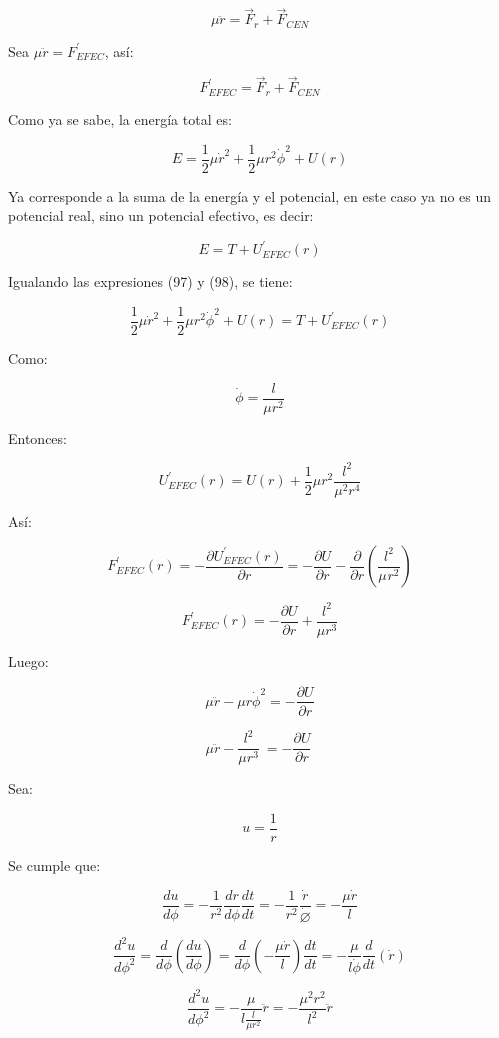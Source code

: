 \documentclass[]{article}
\begin{document}
\[\mu\ddot{r} = {\overrightarrow{F}}_{r} + {\overrightarrow{F}}_{CEN}\]

Sea \(\mu\ddot{r} = F_{EFEC}^{'}\), así:

\[F_{EFEC}^{'} = {\overrightarrow{F}}_{r} + {\overrightarrow{F}}_{CEN}\]

Como ya se sabe, la energía total es:

\[E = \frac{1}{2}\mu{\dot{r}}^{2} + \frac{1}{2}\mu r^{2}{\dot{\phi}}^{2} + U(r)\]

Ya corresponde a la suma de la energía y el potencial, en este caso ya
no es un potencial real, sino un potencial efectivo, es decir:

\[E = T + U_{EFEC}^{'}(r)\]

Igualando las expresiones (97) y (98), se tiene:

\[\frac{1}{2}\mu{\dot{r}}^{2} + \frac{1}{2}\mu r^{2}{\dot{\phi}}^{2} + U(r) = T + U_{EFEC}^{'}(r)\]

Como:

\[\dot{\phi} = \frac{l}{\mu r^{2}}\]

Entonces:

\[U_{EFEC}^{'}(r) = U(r) + \frac{1}{2}\mu r^{2}\frac{l^{2}}{\mu^{2}r^{4}}\]

Así:

\[F_{EFEC}^{'}(r) = - \frac{\partial U_{EFEC}^{'}(r)}{\partial r} = - \frac{\partial U}{\partial r} - \frac{\partial}{\partial r}(\frac{l^{2}}{\mu^{}r^{2}})\]

\[F_{EFEC}^{'}(r) = - \frac{\partial U}{\partial r} + \frac{l^{2}}{\mu r^{3}}\]

Luego:

\[\mu\ddot{r} - \mu r{\dot{\phi}}^{2} = - \frac{\partial U}{\partial r}\]

\[\mu\ddot{r} - \frac{l^{2}}{\mu r^{3}}\  = - \frac{\partial U}{\partial r}\ \]

Sea:

\[u = \frac{1}{r}\]

Se cumple que:

\[\frac{du}{d\phi} = - \frac{1}{r^{2}}\frac{dr}{d\phi}\frac{dt}{dt} = - \frac{1}{r^{2}}\frac{\dot{r}}{\dot{\varnothing}} = - \frac{\mu\dot{r}}{l}\]

\[\frac{d^{2}u}{d\phi^{2}} = \frac{d}{d\phi}\left( \frac{du}{d\phi} \right) = \frac{d}{d\phi}\left( - \frac{\mu\dot{r}}{l} \right)\frac{dt}{dt} = - \frac{\mu}{l\dot{\phi}}\frac{d}{dt}\left( \dot{r} \right)\]

\[\frac{d^{2}u}{d\phi^{2}} = - \frac{\mu}{l\frac{l}{\mu r^{2}}}\ddot{r} = - \frac{\mu^{2}r^{2}}{l^{2}}\ddot{r}\]
\end{document}
